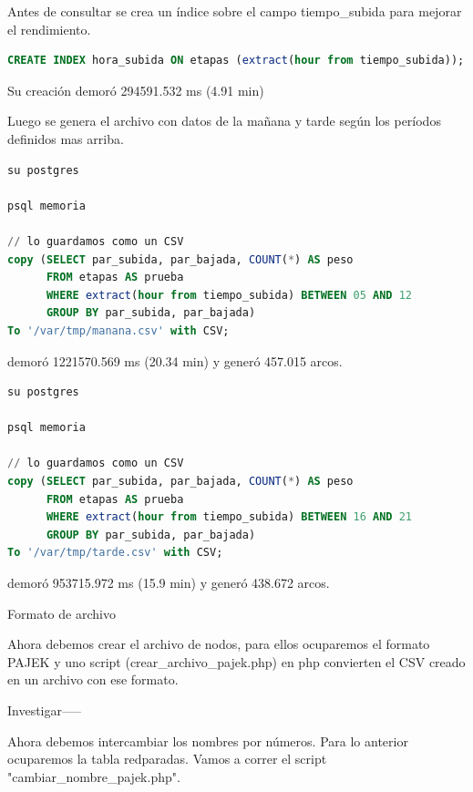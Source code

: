 \documentclass[12pt]{article}
\begin{document}
    Antes de consultar se crea un índice sobre el campo tiempo\_subida para mejorar el rendimiento.

\begin{lstlisting}[breaklines=true, 
				   language=SQL, 
				   caption=Creación de índice,
				   label=fig:generacion_indice]	
CREATE INDEX hora_subida ON etapas (extract(hour from tiempo_subida));
\end{lstlisting}

Su creación demoró 294591.532 ms (4.91 min)

Luego se genera el archivo con datos de la mañana y tarde según los períodos definidos mas arriba.

\begin{lstlisting}[breaklines=true, 
				   language=SQL, 
				   caption=Generación de arcos horario mañana,
				   label=fig:generacion_arcos_manana]		
su postgres

psql memoria
	
// lo guardamos como un CSV
copy (SELECT par_subida, par_bajada, COUNT(*) AS peso 
	  FROM etapas AS prueba 
	  WHERE extract(hour from tiempo_subida) BETWEEN 05 AND 12 
	  GROUP BY par_subida, par_bajada) 
To '/var/tmp/manana.csv' with CSV;
\end{lstlisting}

demoró 1221570.569 ms (20.34 min) y generó 457.015 arcos.

\begin{lstlisting}[breaklines=true, 
				   language=SQL, 
				   caption=Generación de arcos horario tarde,
				   label=fig:generacion_arcos_tarde]		
su postgres

psql memoria
	
// lo guardamos como un CSV
copy (SELECT par_subida, par_bajada, COUNT(*) AS peso 
	  FROM etapas AS prueba 
	  WHERE extract(hour from tiempo_subida) BETWEEN 16 AND 21 
	  GROUP BY par_subida, par_bajada) 
To '/var/tmp/tarde.csv' with CSV;
\end{lstlisting}

demoró 953715.972 ms (15.9 min) y generó 438.672 arcos.

    Formato de archivo
    
	Ahora debemos crear el archivo de nodos, para ellos ocuparemos el formato PAJEK y uno script (crear\_archivo\_pajek.php) en php convierten el CSV creado en un archivo con ese formato.
	
	Investigar-----    
    
    Ahora debemos intercambiar los nombres por números. Para lo anterior ocuparemos la tabla redparadas. Vamos a correr el script "cambiar\_nombre\_pajek.php".
    
\end{document}
